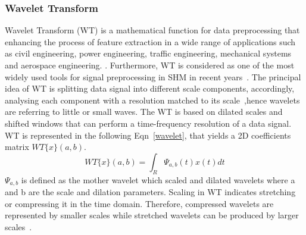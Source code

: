 \subsubsection{Wavelet Transform} 
Wavelet Transform (WT) is a mathematical function for data preprocessing that enhancing the process of feature extraction in a wide range of applications such as civil engineering, power engineering, traffic engineering, mechanical systems and aerospace engineering. . 		
Furthermore, WT is considered as one of the most widely used tools for signal preprocessing in SHM in recent years~\cite{Taha2006}.		
The principal idea of WT is splitting data signal into different scale components, accordingly, analysing each component with a resolution matched to its scale~\cite{Graps1995},hence wavelets are referring to little or small waves. 
The WT is based on dilated scales and shifted windows that can perform a time-frequency resolution of a data signal. 
WT is represented in the following Eqn~\ref{wavelet}, that yields a 2D coefficients matrix  $WT\{x\}(a,b)$. 
\begin{equation}
	WT\{x\}(a,b) = \int_{R}^{}\Psi_{a,b}(t)x(t)dt
	\label{wavelet}
\end{equation}
$\Psi_{a,b}$ is defined as the mother wavelet which scaled and dilated wavelets  where a and b are the scale and dilation parameters.
Scaling in WT indicates stretching or compressing it in the time domain. 
Therefore, compressed wavelets are represented by smaller scales while stretched wavelets can be produced by larger scales~\cite{Graps1995}.
%
